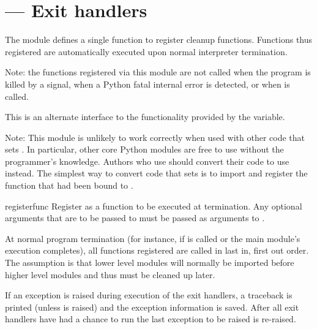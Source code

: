 \section{ ---
         Exit handlers}



The  module defines a single function to register
cleanup functions.  Functions thus registered are automatically
executed upon normal interpreter termination.

Note: the functions registered via this module are not called when the program is killed by a
signal, when a Python fatal internal error is detected, or when
 is called.

This is an alternate interface to the functionality provided by the
 variable.

Note: This module is unlikely to work correctly when used with other code
that sets .  In particular, other core Python modules are
free to use  without the programmer's knowledge.  Authors who
use  should convert their code to use
 instead.  The simplest way to convert code that sets
 is to import  and register the function
that had been bound to .

\begin{funcdesc}{register}{func}
Register  as a function to be executed at termination.  Any
optional arguments that are to be passed to  must be passed
as arguments to .

At normal program termination (for instance, if
 is called or the main module's execution
completes), all functions registered are called in last in, first out
order.  The assumption is that lower level modules will normally be
imported before higher level modules and thus must be cleaned up
later.

If an exception is raised during execution of the exit handlers, a
traceback is printed (unless  is raised) and the
exception information is saved.  After all exit handlers have had a
chance to run the last exception to be raised is re-raised.
\end{funcdesc}


